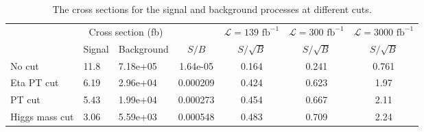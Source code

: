 \documentclass[12pt]{article}
\begin{document}
		\begin{table}[htpb]
			\centering
			\caption{The cross sections for the signal and background processes at different cuts.}
			\label{tab:signal_background_analysis_with_spanet}
			\begin{tabular}{l|ll|c|c|c|c}
							& \multicolumn{2}{|c|}{Cross section (fb)} &          & $\mathcal{L} = 139 \text{ fb}^{-1}$ & $\mathcal{L} = 300 \text{ fb}^{-1}$ & $\mathcal{L} = 3000 \text{ fb}^{-1}$ \\
						       & Signal           & Background          & $S / B$  & $S/\sqrt{B}$& $S/\sqrt{B}$& $S/\sqrt{B}$\\
				\hline		  
				No cut         & 11.8             & 7.18e+05            & 1.64e-05 & 0.164       & 0.241       & 0.761       \\
				Eta PT cut     & 6.19             & 2.96e+04            & 0.000209 & 0.424       & 0.623       & 1.97        \\
				PT cut         & 5.43             & 1.99e+04            & 0.000273 & 0.454       & 0.667       & 2.11        \\
				Higgs mass cut & 3.06             & 5.59e+03            & 0.000548 & 0.483       & 0.709       & 2.24       
			\end{tabular}
		\end{table}
\end{document}
